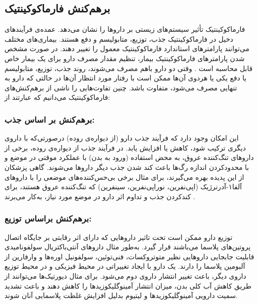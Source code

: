 \subsection{برهم‌کنش فارماکوکینتیک}

فارماکوکینتیک تأثیر سیستم‌های زیستی بر داروها را نشان می‌دهد. عمده‌ی فرآیندهای دخیل در فارماکوکینتیک جذب، توزیع، متابولیسم و دفع هستند. بیماری‌های مختلف می‌توانند پارامترهای استاندارد فارماکوکینتیک معمول را تغییر دهند. در صورت مشخص شدن پارامترهای فارماکوکینتیک بیمار، تنظیم مقدار مصرف دارو برای یک بیمار خاص قابل محاسبه است
\cite{katzung2019katzung}.
وقتی دو دارو با‌هم مصرف می‌شوند، روند جذب، توزیع، متابولیسم یا دفع یکی یا هر‌دوی آن‌ها ممکن‌ است با رفتار مورد انتظار آن‌ها در حالتی که دارو به تنهایی مصرف می‌شود، متفاوت باشد. چنین تفاوت‌هایی را ناشی از برهم‌کنش‌های فارماکوکینتیک می‌دانیم که عبارتند‌ از:
\par
\subsubsection*{برهم‌کنش بر اساس جذب: }
این امکان وجود دارد که فرآیند جذب
دارو (از دیواره‌ی روده) درصورتی‌که با داروی دیگری ترکیب شود، کاهش یا افزایش یابد. در فرآیند جذب از دیواره‌ی روده، برخی از داروهای تنگ‌کننده ‌عروق، به محض استفاده (ورود به بدن) با عملکرد موقتی در موضع و با محدودکردن اندازه ‌رگ‌ها باعث کند شدن جذب دیگر داروها می‌شوند. گاهی پزشکان از این پدیده بهره‌ می‌گیرند، برای مثال برخی بی‌حس‌کننده‌های موضعی را با داروهای آلفا۱-آدرنرژیک (اپی‌نفرین، نوراپی‌نفرین، سینفرین) که تنگ‌کننده عروق هستند، برای کندکردن جذب و تداوم اثر دارو در موضع مورد نیاز، به‌کار می‌برند
\citep{Rescigno2003}.

\par
\subsubsection*{برهم‌کنش بر‌اساس توزیع: }
توزیع
دارو ممکن است تحت تاثیر داروهایی که دارای اثر رقابتی بر جایگاه اتصال پروتین‌های پلاسما می‌باشند قرار گیرد. به‌طور مثال داروهای آنتی‌باکتریال سولفوناميدی قابليت جابجايی داروهايی نظير متوتروکسات، فنی‌توئين، سولفونيل اوره‌ها و وارفارين از آلبومين پلاسما را دارند. یک دارو با ایجاد تغییراتی در محیط فیزیکی و در محیط  توزیع داروی دیگر، باعث تغییر انتشار داروی دوم می‌شود. برای مثال ديورتيک‌ها می‌توانند از طريق کاهش آب کلی بدن، ميزان انتشار آمينوگليکوزيدها را کاهش دهند و باعث تشديد سميت دارويی آمينوگليکوزيدها و ليتيوم بدليل افزايش غلظت پلاسمايی آنان شوند.

\par
